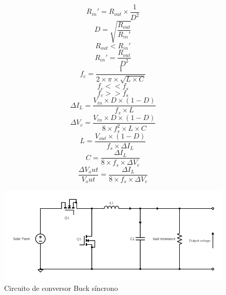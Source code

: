 \begin{equation} \label{rinroutalmostfinal}
	{ R_{in}'} = {R_{out}\times \frac{1}{D^2}} 
\end{equation}
\begin{equation} \label{rinroutfinal}
	{D} = {\sqrt{\frac{R_{out}}{R_{in}'}}} 
\end{equation}
\begin{equation} \label{routlessrin}
	R_{out}<R_{in}'
\end{equation}
\begin{equation} \label{rinbaseonrout}
	R_{in}'={\frac{R_{out}}{D^2}}
\end{equation}
\begin{equation} \label{frecuenciadetanke}
	f_c={\frac{1}{2\times \pi \times \sqrt{L\times C}}}
\end{equation}
\begin{equation} \label{fcmenorfs}
	f_c<<f_s
\end{equation}
\begin{equation} \label{fcmayorfs}
	f_c>>f_s
\end{equation}
\begin{equation} \label{deltail}
	\Delta I_L={\frac{V_{in}\times D \times(1-D)}{f_s\times L}}
\end{equation}
\begin{equation} \label{deltavc}
	\Delta V_c={\frac{V_{in}\times D \times(1-D)}{8\times f_s^2\times L \times C}}
\end{equation}
\begin{equation} \label{calculodeinductancia}
	L={\frac{V_{out} \times(1-D)}{f_s\times \Delta I_L}}
\end{equation}
\begin{equation} \label{calculodecapacitancia}
	C={\frac{\Delta I_L}{8\times f_s\times \Delta V_c}}
\end{equation}
\begin{equation} \label{riplevout}
	{\frac{\Delta V_out}{V_out}}={\frac{\Delta I_L}{8\times f_s\times \Delta V_c}}
\end{equation}
\begin{figure}[H]
    \centering
    \includegraphics[width=1\linewidth,frame]{imagenes/syncbuck.png}
    \caption{Circuito de conversor Buck síncrono}
    \label{fig:circuito_final}
\end{figure}
